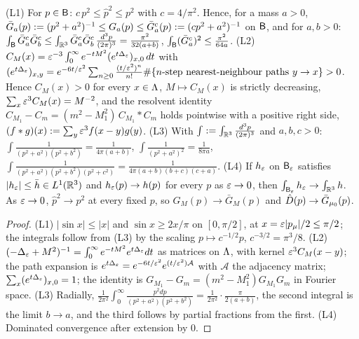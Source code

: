 
\begin{lemma}\label{lem:s14:L}
\textup{(L1)} For $p\in\mathsf B$: $c\,p^2\le\hat p^2\le p^2$ with $c=4/\pi^2$. Hence, for a mass $a>0$, $\bar G_a(p):=(p^2+a^2)^{-1}\le G_a(p)\le\bar G^c_a(p):=(cp^2+a^2)^{-1}$ on $\mathsf B$, and for $a,b>0$: $\int_{\mathsf B}\bar G^c_a\bar G^c_b\le\int_{\mathbb R^3}\bar G^c_a\bar G^c_b\,\frac{d^3p}{(2\pi)^3}=\frac{\pi^2}{32(a+b)}$, $\int_{\mathsf B}(\bar G^c_a)^2\le\frac{\pi^2}{64a}$.
\textup{(L2)} $C_M(x)=\varepsilon^{-3}\int_0^\infty e^{-tM^2}(e^{t\Delta_{\varepsilon}})_{x,0}\,dt$ with $(e^{t\Delta_{\varepsilon}})_{x,y}=e^{-6t/\varepsilon^2}\sum_{n\ge0}\frac{(t/\varepsilon^2)^n}{n!}\#\{n\text{-step nearest-neighbour paths }y\to x\}>0$. Hence $C_M(x)>0$ for every $x\in\Lambda$, $M\mapsto C_M(x)$ is strictly decreasing, $\sum_x\varepsilon^3C_M(x)=M^{-2}$, and the resolvent identity $C_{M_1}-C_m=(m^2-M_1^2)\,C_{M_1}*C_m$ holds pointwise with a positive right side, $(f*g)(x):=\sum_y\varepsilon^3f(x-y)g(y)$.
\textup{(L3)} With $\int:=\int_{\mathbb R^3}\frac{d^3p}{(2\pi)^3}$ and $a,b,c>0$: $\int\frac1{(p^2+a^2)(p^2+b^2)}=\frac1{4\pi(a+b)}$, $\int\frac1{(p^2+a^2)^2}=\frac1{8\pi a}$, $\int\frac1{(p^2+a^2)(p^2+b^2)(p^2+c^2)}=\frac1{4\pi(a+b)(b+c)(c+a)}$.
\textup{(L4)} If $h_{\varepsilon}$ on $\mathsf B_{\varepsilon}$ satisfies $|h_{\varepsilon}|\le\bar h\in L^1(\mathbb R^3)$ and $h_{\varepsilon}(p)\to h(p)$ for every $p$ as $\varepsilon\to0$, then $\int_{\mathsf B_{\varepsilon}}h_{\varepsilon}\to\int_{\mathbb R^3}h$. As $\varepsilon\to0$, $\hat p^2\to p^2$ at every fixed $p$, so $G_M(p)\to\bar G_M(p)$ and $\hat D(p)\to\bar G_{\mu_0}(p)$.
\end{lemma}

\begin{proof}
(L1) $|\sin x|\le|x|$ and $\sin x\ge2x/\pi$ on $[0,\pi/2]$, at $x=\varepsilon|p_\mu|/2\le\pi/2$; the integrals follow from (L3) by the scaling $p\mapsto c^{-1/2}p$, $c^{-3/2}=\pi^3/8$. (L2) $(-\Delta_{\varepsilon}+M^2)^{-1}=\int_0^\infty e^{-tM^2}e^{t\Delta_{\varepsilon}}dt$ as matrices on $\Lambda$, with kernel $\varepsilon^3C_M(x-y)$; the path expansion is $e^{t\Delta_{\varepsilon}}=e^{-6t/\varepsilon^2}e^{(t/\varepsilon^2)\mathcal A}$ with $\mathcal A$ the adjacency matrix; $\sum_x(e^{t\Delta_{\varepsilon}})_{x,0}=1$; the identity is $G_{M_1}-G_m=(m^2-M_1^2)G_{M_1}G_m$ in Fourier space. (L3) Radially, $\frac1{2\pi^2}\int_0^\infty\frac{p^2dp}{(p^2+a^2)(p^2+b^2)}=\frac1{2\pi^2}\cdot\frac{\pi}{2(a+b)}$, the second integral is the limit $b\to a$, and the third follows by partial fractions from the first. (L4) Dominated convergence after extension by $0$.
\end{proof}

